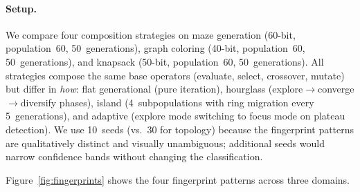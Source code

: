 \documentclass[dvipsnames,format=sigconf,anonymous=true,review=false]{acmart}
\begin{document}
\paragraph{Setup.}
\label{sec:fingerprint-setup}
We compare four composition strategies on maze generation (60-bit, population~60, 50~generations), graph coloring (40-bit, population~60, 50~generations), and knapsack (50-bit, population~60, 50~generations). All strategies compose the same base operators (evaluate, select, crossover, mutate) but differ in \emph{how}: flat generational (pure iteration), hourglass (explore$\to$converge$\to$diversify phases), island (4~subpopulations with ring migration every 5~generations), and adaptive (explore mode switching to focus mode on plateau detection). We use 10~seeds (vs.\ 30 for topology) because the fingerprint patterns are qualitatively distinct and visually unambiguous; additional seeds would narrow confidence bands without changing the classification.

Figure~\ref{fig:fingerprints} shows the four fingerprint patterns across three domains.
\end{document}
